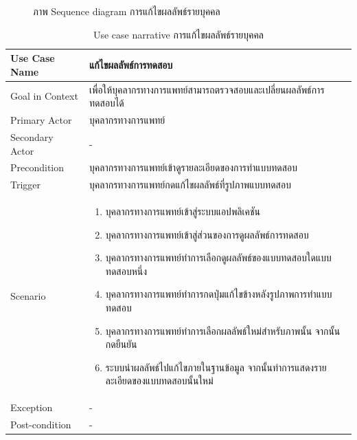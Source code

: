\documentclass[12pt,oneside,openright,a4paper]{cpe-thai-project}
\begin{document}
\begin{itemize}
\begin{figure}[!ht]
        \caption{ภาพ Sequence diagram การแก้ไขผลลัพธ์รายบุคคล}\label{fig:activity5}
       \end{figure}
       \newpage
       \begin{table}[!h]\centering
        \caption{Use case narrative การแก้ไขผลลัพธ์รายบุคคล}\label{tbl:application1}
        \begin{tabular}{|p{4cm}|p{10cm}|} \hline
        Use Case Name & แก้ไขผลลัพธ์การทดสอบ \\ \hline
        Goal in Context & เพื่อให้บุคลากรทางการแพทย์สามารถตรวจสอบและเปลี่ยนผลลัพธ์การทดสอบได้ \\ \hline
        Primary Actor & บุคลากรทางการแพทย์ \\ \hline
        Secondary Actor & - \\ \hline
        Precondition & บุคลากรทางการแพทย์เข้าดูรายละเอียดของการทำแบบทดสอบ \\ \hline
        Trigger & บุคลากรทางการแพทย์กดแก้ไขผลลัพธ์ที่รูปภาพแบบทดสอบ \\ \hline
        Scenario & \begin{enumerate}
          \item บุคลากรทางการแพทย์เข้าสู่ระบบแอปพลิเคชัน
          \item บุคลากรทางการแพทย์เข้าสู่ส่วนของการดูผลลัพธ์การทดสอบ
          \item บุคลากรทางการแพทย์ทำการเลือกดูผลลัพธ์ของแบบทดสอบใดแบบทดสอบหนึ่ง
          \item บุคลากรทางการแพทย์ทำการกดปุ่มแก้ไขข้างหลังรูปภาพการทำแบบทดสอบ
          \item บุคลากรทางการแพทย์ทำการเลือกผลลัพธ์ใหม่สำหรับภาพนั้น จากนั้นกดยืนยัน
          \item ระบบนำผลลัพธ์ไปแก้ไขภายในฐานข้อมูล จากนั้นทำการแสดงรายละเอียดของแบบทดสอบนั้นใหม่ 
        \end{enumerate} \\ \hline
        Exception & - \\ \hline
        Post-condition & - \\ \hline
    

\end{tabular}
\end{table}
\end{itemize}
\end{document}
